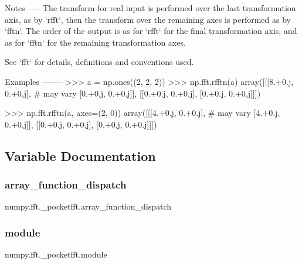 \begin{DoxyVerb}
Notes
-----
The transform for real input is performed over the last transformation
axis, as by `rfft`, then the transform over the remaining axes is
performed as by `fftn`.  The order of the output is as for `rfft` for the
final transformation axis, and as for `fftn` for the remaining
transformation axes.

See `fft` for details, definitions and conventions used.

Examples
--------
>>> a = np.ones((2, 2, 2))
>>> np.fft.rfftn(a)
array([[[8.+0.j,  0.+0.j], # may vary
        [0.+0.j,  0.+0.j]],
       [[0.+0.j,  0.+0.j],
        [0.+0.j,  0.+0.j]]])

>>> np.fft.rfftn(a, axes=(2, 0))
array([[[4.+0.j,  0.+0.j], # may vary
        [4.+0.j,  0.+0.j]],
       [[0.+0.j,  0.+0.j],
        [0.+0.j,  0.+0.j]]])\end{DoxyVerb}
 

\subsection{Variable Documentation}
\mbox{\label{namespacenumpy_1_1fft_1_1__pocketfft_ac165d2501f6b926b97841274eec90812}} 
\subsubsection{\texorpdfstring{array\+\_\+function\+\_\+dispatch}{array\_function\_dispatch}}
{\footnotesize\ttfamily numpy.\+fft.\+\_\+pocketfft.\+array\+\_\+function\+\_\+dispatch}

\mbox{\label{namespacenumpy_1_1fft_1_1__pocketfft_a3d0e5a4fab5b50fbcd79afd4913d1fa2}} 
\subsubsection{\texorpdfstring{module}{module}}
{\footnotesize\ttfamily numpy.\+fft.\+\_\+pocketfft.\+module}

